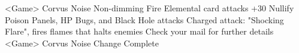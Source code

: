 <Game> Corvus Noise 
Non-dimming Fire Elemental card attacks +30 
Nullify Poison Panels, HP Bugs, and Black Hole attacks 
Charged attack: "Shocking Flare", fires flames that halts enemies 
Check your mail for further details 
<Game> Corvus Noise Change Complete 
